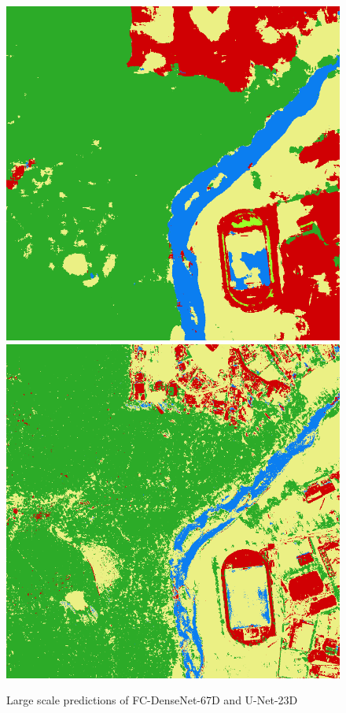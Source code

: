 \begin{figure}
    \includegraphics[width=\DiscussionImageWidth]{images/segmentation_discussion/unet/3.png} \hfill
    \includegraphics[width=\DiscussionImageWidth]{images/segmentation_discussion/densenet/3.png}

    \caption{Large scale predictions of FC-DenseNet-67D and U-Net-23D}
    \label{fig:segmentation_discussion}
\end{figure}

